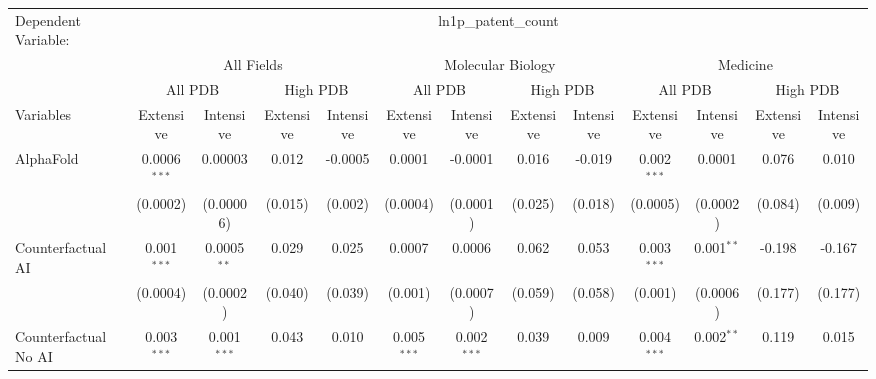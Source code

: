 \begingroup
\centering
\begin{tabular}{lcccccccccccc}
   \tabularnewline \midrule \midrule
   Dependent Variable: & \multicolumn{12}{c}{ln1p\_patent\_count}\\
 & \multicolumn{4}{c}{All Fields} & \multicolumn{4}{c}{Molecular Biology} & \multicolumn{4}{c}{Medicine} \\
\cmidrule(lr){2-5} \cmidrule(lr){6-9} \cmidrule(lr){10-13}
 & \multicolumn{2}{c}{All PDB} & \multicolumn{2}{c}{High PDB} & \multicolumn{2}{c}{All PDB} & \multicolumn{2}{c}{High PDB} & \multicolumn{2}{c}{All PDB} & \multicolumn{2}{c}{High PDB} \\
\cmidrule(lr){2-3} \cmidrule(lr){4-5} \cmidrule(lr){6-7} \cmidrule(lr){8-9} \cmidrule(lr){10-11} \cmidrule(lr){12-13}
Variables & \multicolumn{1}{c}{Extensive} & \multicolumn{1}{c}{Intensive} & \multicolumn{1}{c}{Extensive} & \multicolumn{1}{c}{Intensive} & \multicolumn{1}{c}{Extensive} & \multicolumn{1}{c}{Intensive} & \multicolumn{1}{c}{Extensive} & \multicolumn{1}{c}{Intensive} & \multicolumn{1}{c}{Extensive} & \multicolumn{1}{c}{Intensive} & \multicolumn{1}{c}{Extensive} & \multicolumn{1}{c}{Intensive} \\
\cmidrule(lr){1-1}\cmidrule(lr){2-2} \cmidrule(lr){3-3} \cmidrule(lr){4-4} \cmidrule(lr){5-5} \cmidrule(lr){6-6} \cmidrule(lr){7-7} \cmidrule(lr){8-8} \cmidrule(lr){9-9} \cmidrule(lr){10-10} \cmidrule(lr){11-11} \cmidrule(lr){12-12} \cmidrule(lr){13-13}
   AlphaFold                                & 0.0006$^{***}$ & 0.00003        & 0.012   & -0.0005  & 0.0001         & -0.0001        & 0.016   & -0.019  & 0.002$^{***}$ & 0.0001        & 0.076   & 0.010\\   
                                            & (0.0002)       & (0.00006)      & (0.015) & (0.002)  & (0.0004)       & (0.0001)       & (0.025) & (0.018) & (0.0005)      & (0.0002)      & (0.084) & (0.009)\\   
   Counterfactual AI                        & 0.001$^{***}$  & 0.0005$^{**}$  & 0.029   & 0.025    & 0.0007         & 0.0006         & 0.062   & 0.053   & 0.003$^{***}$ & 0.001$^{**}$  & -0.198  & -0.167\\   
                                            & (0.0004)       & (0.0002)       & (0.040) & (0.039)  & (0.001)        & (0.0007)       & (0.059) & (0.058) & (0.001)       & (0.0006)      & (0.177) & (0.177)\\   
   Counterfactual No AI                     & 0.003$^{***}$  & 0.001$^{***}$  & 0.043   & 0.010    & 0.005$^{***}$  & 0.002$^{***}$  & 0.039   & 0.009   & 0.004$^{***}$ & 0.002$^{**}$  & 0.119   & 0.015\\   

\end{tabular}
